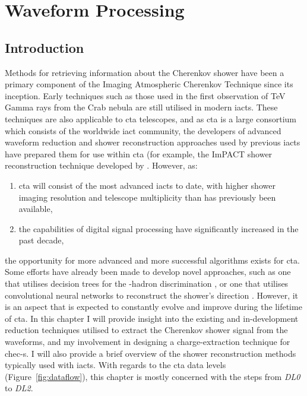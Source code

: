 \chapter{\label{ch6-reduction}Waveform Processing} 

\minitoc

\section{Introduction}

Methods for retrieving information about the Cherenkov shower have been a primary component of the Imaging Atmospheric Cherenkov Technique since its inception. Early techniques such as those used in the first observation of TeV Gamma rays from the Crab nebula \cite{Weekes1989} are still utilised in modern \glspl{iact}. These techniques are also applicable to \gls{cta} telescopes, and as \gls{cta} is a large consortium which consists of the worldwide \gls{iact} community, the developers of advanced waveform reduction and shower reconstruction approaches used by previous \glspl{iact} have prepared them for use within \gls{cta} (for example, the ImPACT shower reconstruction technique developed by \cite{Parsons2014}. However, as:
\begin{enumerate}[label=(\alph*)]
	\item \gls{cta} will consist of the most advanced \glspl{iact} to date, with higher shower imaging resolution and telescope multiplicity than has previously been available,
	\item the capabilities of digital signal processing have significantly increased in the past decade,
\end{enumerate}
the opportunity for more advanced and more successful algorithms exists for \gls{cta}. Some efforts have already been made to develop novel approaches, such as one that utilises decision trees for the \textgamma-hadron discrimination \cite{Ohm2009}, or one that utilises convolutional neural networks to reconstruct the shower's direction \cite{Shilon2018}. However, it is an aspect that is expected to constantly evolve and improve during the lifetime of \gls{cta}. In this chapter I will provide insight into the existing and in-development reduction techniques utilised to extract the Cherenkov shower signal from the waveforms, and my involvement in designing a charge-extraction technique for \gls{chec-s}. I will also provide a brief overview of the shower reconstruction methods typically used with \glspl{iact}. With regards to the \gls{cta} data levels (Figure~\ref{fig:dataflow}), this chapter is mostly concerned with the steps from \textit{DL0} to \textit{DL2}.

